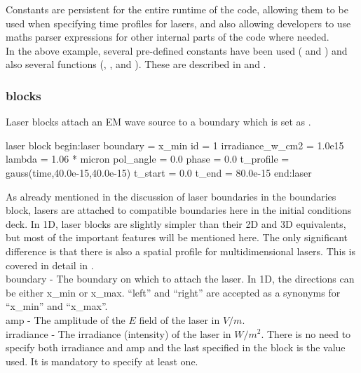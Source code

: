Constants are persistent for the entire runtime of the code,
allowing them to be used when specifying time profiles for lasers, and also
allowing developers to use maths parser expressions for other internal parts of
the code where needed.\\

In the above example, several pre-defined constants have been used
( and ) and also several functions
(, ,  and
). These are described in  and
.

\subsubsection{ blocks}
\label{sec:lasers}
Laser blocks attach an EM wave source to a boundary which is set as
.

\begin{lboxverbatim}{laser block}
begin:laser
   boundary = x_min
   id = 1
   irradiance_w_cm2 = 1.0e15
   lambda = 1.06 * micron
   pol_angle = 0.0
   phase = 0.0
   t_profile = gauss(time,40.0e-15,40.0e-15)
   t_start = 0.0
   t_end = 80.0e-15
end:laser
\end{lboxverbatim}

As already mentioned in the discussion of laser boundaries in the boundaries
block, lasers are attached to compatible boundaries here in the initial
conditions deck. In 1D, laser blocks are slightly simpler than their 2D and 3D
equivalents, but most of the important features will be mentioned here. The
only significant difference is that there is also a spatial profile for
multidimensional lasers. This is covered in detail in
.\\

{\emphtext boundary} - The boundary on which to attach the laser.
In 1D, the directions can be either x\_min or x\_max.  ``left'' and ``right''
are accepted as a synonyms for ``x\_min'' and ``x\_max''.\\

{\emphtext amp} - The amplitude of the $E$ field of the laser in $V/m$.\\

{\emphtext irradiance} - The irradiance (intensity) of the laser in $W/m^2$.
There is no need to specify both irradiance and amp and the last specified
in the block is the value used. It is mandatory to specify at least one.\\

